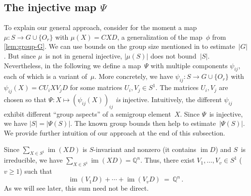 \documentclass{lmcs}
\theoremstyle{definition}
\DeclareMathOperator{\im}{im}
\newcommand{\Q}{\mathbb{Q}}
\begin{document}
\subsection{The injective map \texorpdfstring{$\Psi$}{Psi}} \label{sub:Psi}

To explain our general approach, consider for the moment a map $\mu: S \to G \cup \{O_r\}$ with $\mu(X) = C X D$, a generalization of the map~$\phi$ from \cref{lem:group-G}.
We can use bounds on the group size mentioned in  to estimate~$|G|$.
But since $\mu$~is not in general injective, $|\mu(S)|$ does not bound~$|S|$.
Nevertheless, in the following we define a map~$\Psi$ with multiple components $\psi_{i j}$, each of which is a variant of~$\mu$.
More concretely, we have $\psi_{i j}: S \to G \cup \{O_r\}$ with $\psi_{i j}(X) = C U_i X V_j D$ for some matrices $U_i, V_j \in S^{1}$.
The matrices $U_i, V_j$ are chosen so that $\Psi : X \mapsto (\psi_{i j}(X))_{i j}$ \emph{is} injective.
Intuitively, the different $\psi_{i j}$ exhibit different ``group aspects'' of a semigroup element~$X$.
Since $\Psi$~is injective, we have $|S| = |\Psi(S)|$.
The known group bounds then help to estimate~$|\Psi(S)|$. We provide further intuition of our approach at the end of this subsection. %

Since $\sum_{X \in S^1} \im (X D)$ is $S$-invariant and nonzero (it contains $\im D$) and $S$~is irreducible, we have $\sum_{X \in S^1} \im (X D) = \Q^n$.
Thus, there exist $V_1, \ldots, V_v \in S^1$ ($v \ge 1$) such that
\[
 \im(V_1 D) + \cdots + \im(V_v D) \ = \ \Q^n\,.
\]
As we will see later, this sum need not be direct.
\end{document}
